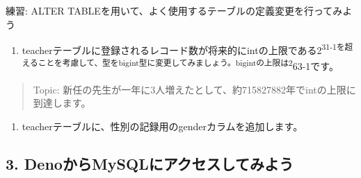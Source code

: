 練習: ALTER TABLEを用いて、よく使用するテーブルの定義変更を行ってみよう

\begin{enumerate}
\def\labelenumi{\arabic{enumi}.}
\tightlist
\item
  teacherテーブルに登録されるレコード数が将来的にintの上限である2\textsuperscript{31-1を超えることを考慮して、型をbigint型に変更してみましょう。bigintの上限は2}63-1です。
\end{enumerate}

\begin{quote}
Topic:
新任の先生が一年に3人増えたとして、約715827882年でintの上限に到達します。
\end{quote}

\begin{Shaded}
\begin{Highlighting}[]
 
   

\end{Highlighting}
\end{Shaded}

\begin{enumerate}
\def\labelenumi{\arabic{enumi}.}
\setcounter{enumi}{1}
\tightlist
\item
  teacherテーブルに、性別の記録用のgenderカラムを追加します。
\end{enumerate}

\begin{Shaded}
\begin{Highlighting}[]
 
 \NormalTok{(}\NormalTok{) }

 \OperatorTok{*} 
\end{Highlighting}
\end{Shaded}

\subsection{3.
DenoからMySQLにアクセスしてみよう}\label{denoux304bux3089mysqlux306bux30a2ux30afux30bbux30b9ux3057ux3066ux307fux3088ux3046}


